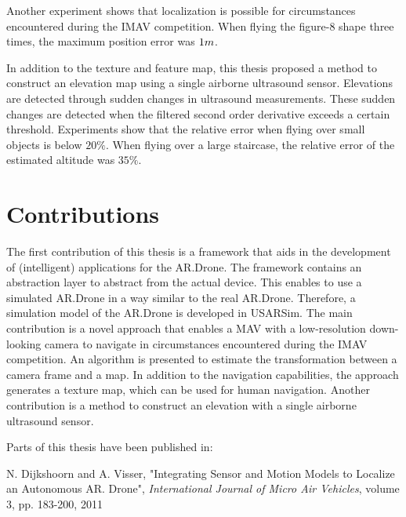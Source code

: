 Another experiment shows that localization is possible for circumstances encountered during the IMAV competition.
When flying the figure-8 shape three times, the maximum position error was $1\small{m}$.

In addition to the texture and feature map, this thesis proposed a method to construct an elevation map using a single airborne ultrasound sensor.
Elevations are detected through sudden changes in ultrasound measurements.
These sudden changes are detected when the filtered second order derivative exceeds a certain threshold.
Experiments show that the relative error when flying over small objects is below $20\%$.
When flying over a large staircase, the relative error of the estimated altitude was $35\%$.









\section{Contributions}
\label{sec:conclusions-contributions}

The first contribution of this thesis is a framework that aids in the development of (intelligent) applications for the AR.Drone.
The framework contains an abstraction layer to abstract from the actual device.
This enables to use a simulated AR.Drone in a way similar to the real AR.Drone.
Therefore, a simulation model of the AR.Drone is developed in USARSim.
The main contribution is a novel approach that enables a MAV with a low-resolution down-looking camera to navigate in circumstances encountered during the IMAV competition.
An algorithm is presented to estimate the transformation between a camera frame and a map.
In addition to the navigation capabilities, the approach generates a texture map, which can be used for human navigation.
Another contribution is a method to construct an elevation with a single airborne ultrasound sensor.

Parts of this thesis have been published in:

\vspace{\baselineskip}

N. Dijkshoorn and A. Visser, "Integrating Sensor and Motion Models to Localize an Autonomous AR. Drone", \textit{International Journal of Micro Air Vehicles}, volume 3, pp. 183-200, 2011

